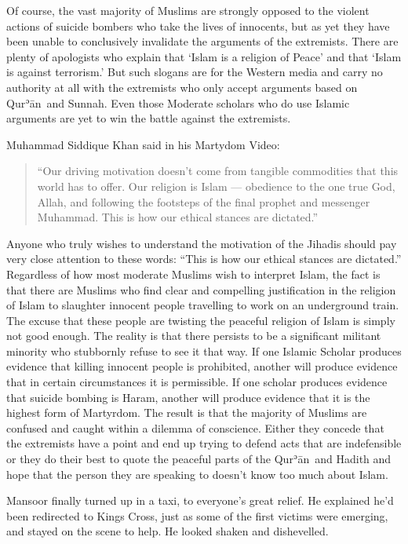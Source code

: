 \documentclass[12pt]{memoir}
\def\´{ʾ} %
\newcommand{\cor}[2]{#2} %
\def \Quran{Qur\-\´ān} %
\begin{document}
Of course, the vast majority of Muslims are strongly opposed \cor{}{to}
the violent actions of suicide bombers
who take the lives of innocents,
but as yet they have been unable to conclusively invalidate
the arguments of the extremists.
There are plenty of apologists who explain that ‘Islam is a religion of Peace’
and that ‘Islam is against terrorism.’
But such slogans are for the Western media and carry no authority at all
with the extremists who only accept arguments based on \Quran\ and Sunnah.
Even those Moderate scholars who do use Islamic arguments
are yet to win the battle against the extremists.

Muhammad Siddique Khan said in his Martydom Video:

\begin{quote}
“Our driving motivation doesn’t come from tangible commodities
that this world has to offer.
Our religion is Islam — obedience to the one true God, Allah,
and following the footsteps of the final prophet and messenger Muhammad.
This is how our ethical stances are dictated.”
\end{quote}

Anyone who truly wishes to understand the motivation of the Jihadis
should pay very close attention to these words:
“This is how our ethical stances are dictated.”
Regardless of how most moderate Muslims wish to interpret Islam,
the fact is that there are Muslims who find clear and compelling justification
in the religion of Islam to slaughter innocent people
travelling to work on an underground train.
The excuse that these people are twisting the peaceful religion of Islam
is simply not good enough.
The reality is that there persists to be a significant militant minority
who stubbornly refuse to see it that way.
If one Islamic Scholar produces evidence
that killing innocent people is prohibited,
another will produce evidence that in certain circumstances it is permissible.
If one scholar produces evidence that suicide bombing is Haram,
another will produce evidence that it is the highest form of Martyrdom.
The result is that the majority of Muslims are confused
and caught within a dilemma of conscience.
Either they concede that the extremists have a point
and end up trying to defend acts that are indefensible
or they do their best to quote the peaceful parts of the \Quran\ and Hadith
and hope that the person they are speaking to
doesn’t know too much about Islam.

Mansoor finally turned up in a taxi, to everyone’s great relief.
He explained he’d been re\cor{-}{}directed to Kings Cross,
just as some of the first victims were emerging,
and stayed on the scene to help.
He looked shaken and dishevelled.
\end{document}
